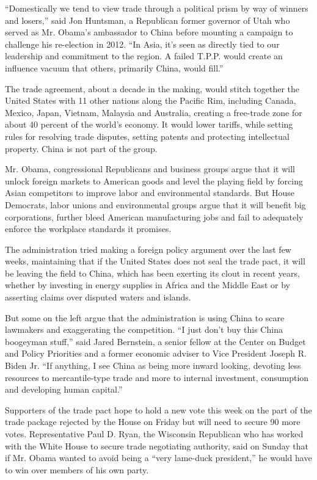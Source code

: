 ``Domestically we tend to view trade through a political prism by way of
winners and losers,'' said Jon Huntsman, a Republican former governor of
Utah who served as Mr. Obama's ambassador to China before mounting a
campaign to challenge his re-election in 2012. ``In Asia, it's seen as
directly tied to our leadership and commitment to the region. A failed
T.P.P. would create an influence vacuum that others, primarily China,
would fill.''

The trade agreement, about a decade in the making, would stitch together
the United States with 11 other nations along the Pacific Rim, including
Canada, Mexico, Japan, Vietnam, Malaysia and Australia, creating a
free-trade zone for about 40 percent of the world's economy. It would
lower tariffs, while setting rules for resolving trade disputes, setting
patents and protecting intellectual property. China is not part of the
group.

Mr. Obama, congressional Republicans and business groups argue that it
will unlock foreign markets to American goods and level the playing
field by forcing Asian competitors to improve labor and environmental
standards. But House Democrats, labor unions and environmental groups
argue that it will benefit big corporations, further bleed American
manufacturing jobs and fail to adequately enforce the workplace
standards it promises.

The administration tried making a foreign policy argument over the last
few weeks, maintaining that if the United States does not seal the trade
pact, it will be leaving the field to China, which has been exerting its
clout in recent years, whether by investing in energy supplies in Africa
and the Middle East or by asserting claims over disputed waters and
islands.

But some on the left argue that the administration is using China to
scare lawmakers and exaggerating the competition. ``I just don't buy
this China boogeyman stuff,'' said Jared Bernstein, a senior fellow at
the Center on Budget and Policy Priorities and a former economic adviser
to Vice President Joseph R. Biden Jr. ``If anything, I see China as
being more inward looking, devoting less resources to mercantile-type
trade and more to internal investment, consumption and developing human
capital.''

Supporters of the trade pact hope to hold a new vote this week on the
part of the trade package rejected by the House on Friday but will need
to secure 90 more votes. Representative Paul D. Ryan, the Wisconsin
Republican who has worked with the White House to secure trade
negotiating authority, said on Sunday that if Mr. Obama wanted to avoid
being a ``very lame-duck president,'' he would have to win over members
of his own party.

